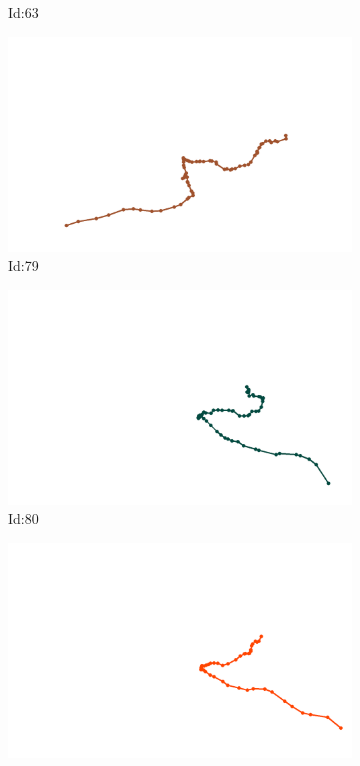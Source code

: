 \documentclass[12pt,twoside]{report}
\begin{document}
\begin{figure}
\begin{subfigure}[b]{0.20\textwidth}
\caption{Id:63}
\end{subfigure}
\begin{subfigure}[b]{0.20\textwidth}
\centering
\includegraphics[width=\textwidth]{../../trajectories/79.png}
\caption{Id:79}
\end{subfigure}
\begin{subfigure}[b]{0.20\textwidth}
\centering
\includegraphics[width=\textwidth]{../../trajectories/80.png}
\caption{Id:80}
\end{subfigure}
\begin{subfigure}[b]{0.20\textwidth}
\centering
\includegraphics[width=\textwidth]{../../trajectories/244.png}

\end{subfigure}
\end{figure}
\end{document}
